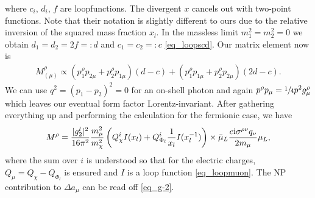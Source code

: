 where $c_i$, $d_i$, $f$ are loopfunctions. The divergent $x$
cancels out with two-point functions. Note that their notation is slightly different to ours due to the relative inversion of the squared mass 
fraction $x_l$. In the massless limit $m_1^2 = m_2^2 = 0$ we obtain $d_1 = d_2 = 2f =: d$ and $c_1 = c_2 =: c$ \eqref{eq_loopscd}. 
Our matrix element now is
\begin{align}
 M^\rho_{(\mu)} \propto (p_1^\rho p_{2\mu} + p_2^\rho p_{1\mu}) (d-c) + (p_1^\rho p_{1\mu} + p_2^\rho p_{2\mu}) (2d-c).
 \label{eq_g2loopscdf}
\end{align}
We can use $q^2 = (p_1-p_2)^2 = 0$ for an on-shell photon and again $p^\rho p_\mu = \sfrac{1}{4} p^2 g^\rho_\mu $ which leaves our eventual form factor 
Lorentz-invariant. After gathering everything up and performing the calculation for the fermionic case, we have
\begin{align}
 M^\rho = \frac{|g^l_2|^2}{16\pi^2} \frac{m^2_\mu}{m_\chi^2}\left(Q_\chi^i I(x_l) + Q_{\Phi_l}^i \frac{1}{x_l} I(x_l^{-1}) \right)\times \bar \mu_L\frac{e\text{i}\sigma^{\rho\nu}q_\nu}{2m_\mu} \mu_L,
 \label{eq_g-2}
\end{align}
where the sum over $i$ is understood so that for the electric charges, $Q_\mu = Q_\chi - Q_{\Phi_l}$ is ensured and $I$ is a loop function 
\eqref{eq_loopmuon}. The NP contribution to $\Delta a_\mu$ can be read off \eqref{eq_g-2}.

